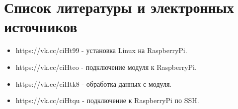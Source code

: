 \documentclass[a4paper, 14pt]{article}
\begin{document}
\section{Список литературы и электронных источников}

\begin{itemize}
	\item https://vk.cc/ciHt99 - установка Linux на RaspberryPi.
	\item https://vk.cc/ciHteo - подключение модуля к RaspberryPi.
	\item https://vk.cc/ciHtk8 - обработка данных с модуля.
	\item https://vk.cc/ciHtqu - подключение к RaspberryPi по SSH.
\end{itemize}
\end{document}
